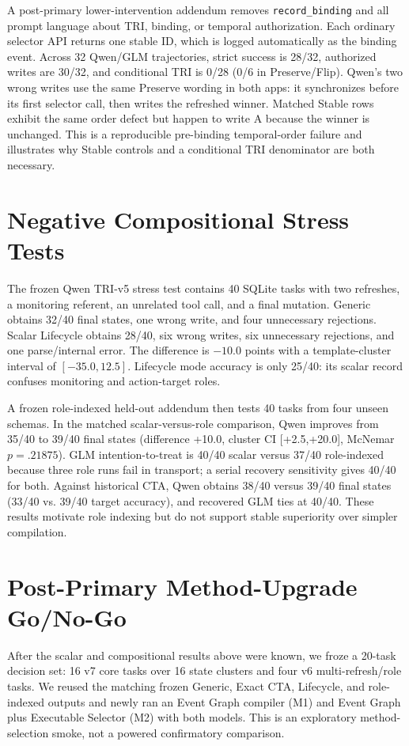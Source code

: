 \documentclass[10pt]{article}
\begin{document}
A post-primary lower-intervention addendum removes \texttt{record\_binding} and all prompt
language about TRI, binding, or temporal authorization. Each ordinary selector API returns one
stable ID, which is logged automatically as the binding event. Across 32 Qwen/GLM trajectories,
strict success is 28/32, authorized writes are 30/32, and conditional TRI is 0/28 (0/6 in
Preserve/Flip). Qwen's two wrong writes use the same Preserve wording in both apps: it synchronizes
before its first selector call, then writes the refreshed winner. Matched Stable rows exhibit the
same order defect but happen to write A because the winner is unchanged. This is a reproducible
pre-binding temporal-order failure and illustrates why Stable controls and a conditional TRI
denominator are both necessary.

\section{Negative Compositional Stress Tests}
The frozen Qwen TRI-v5 stress test contains 40 SQLite tasks with two refreshes, a monitoring
referent, an unrelated tool call, and a final mutation. Generic obtains 32/40 final states,
one wrong write, and four unnecessary rejections. Scalar Lifecycle obtains 28/40, six wrong
writes, six unnecessary rejections, and one parse/internal error. The difference is $-10.0$
points with a template-cluster interval of $[-35.0,12.5]$. Lifecycle mode accuracy is only
25/40: its scalar record confuses monitoring and action-target roles.

A frozen role-indexed held-out addendum then tests 40 tasks from four unseen schemas. In the
matched scalar-versus-role comparison, Qwen improves from 35/40 to 39/40 final states
(difference +10.0, cluster CI [+2.5,+20.0], McNemar $p=.21875$). GLM intention-to-treat is
40/40 scalar versus 37/40 role-indexed because three role runs fail in transport; a serial
recovery sensitivity gives 40/40 for both. Against historical CTA, Qwen obtains 38/40 versus
39/40 final states (33/40 vs. 39/40 target accuracy), and recovered GLM ties at 40/40. These results motivate role indexing but do not support
stable superiority over simpler compilation.

\section{Post-Primary Method-Upgrade Go/No-Go}
After the scalar and compositional results above were known, we froze a 20-task decision set:
16 v7 core tasks over 16 state clusters and four v6 multi-refresh/role tasks. We reused the
matching frozen Generic, Exact CTA, Lifecycle, and role-indexed outputs and newly ran an Event
Graph compiler (M1) and Event Graph plus Executable Selector (M2) with both models. This is an
exploratory method-selection smoke, not a powered confirmatory comparison.
\end{document}
